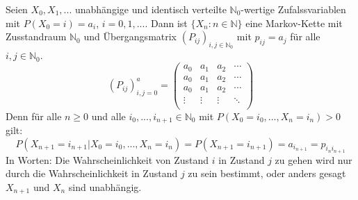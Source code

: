\documentclass[a4paper,12pt]{article}
\begin{document}
\begin{tcolorbox}[breakable, colframe=blue, colback=white, title=Beispiel 2]
	Seien $X_0, X_1, ...$ unabhängige und identisch verteilte $\mathbb{N}_0$-wertige Zufalssvariablen mit $P(X_0 = i) = a_i$, $ i = 0, 1, ...$. Dann ist
	$
		\{ X_n: n \in \mathbb{N}   \}
	$
	eine Markov-Kette mit Zusstandraum $\mathbb{N}_0$ und Übergangsmatrix $(P_{ij})_{i,j \in \mathbb{N}_0}$ mit $p_{ij} = a_j$ für alle $i,j \in \mathbb{N}_0$.
	$$
		\left( P_{ij} \right)^a_{i,j = 0} =
		\begin{pmatrix}
			a_0    & a_1    & a_2    & \cdots \\
			a_0    & a_1    & a_2    & \cdots \\
			a_0    & a_1    & a_2    & \cdots \\
			\vdots & \vdots & \vdots & \ddots \\
		\end{pmatrix}
	$$
	Denn für alle $n \geq 0$ und alle $i_0, ..., i_{n+1} \in \mathbb{N}_0$ mit $P(X_0 = i_0, ..., X_n=i_n) > 0$ gilt:
	$$
		P(X_{n+1} = i_{n+1}| X_0 = i_0, ..., X_n = i_n) = P(X_{n+1} = i_{n+1}) = a_{i_{n+1}} = p_{i_ni_{n+1}}
	$$
	In Worten: Die Wahrscheinlichkeit von Zustand $i$ in Zustand $j$ zu gehen wird nur durch die Wahrscheinlichkeit in Zustand
	$j$ zu sein bestimmt, oder anders gesagt $X_{n+1}$ und $X_n$ sind unabhängig.
\end{tcolorbox}
\end{document}
